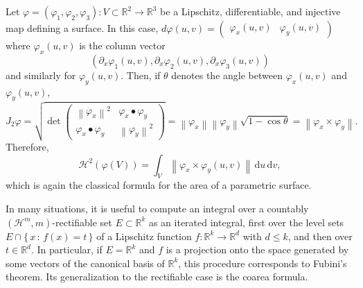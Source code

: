 \documentclass[runningheads]{llncs}
\newcommand{\norm}[1]{\left\|#1\right\|}
\def \d{\mbox{\(\,\mathrm{d}\)}}
\newcommand{\Rr}{\mathbb{R}}
\newcommand{\set}[2]{\{\,#1 \, : \, #2\,\} }
\begin{document}
\begin{example}[Surfaces]\label{ex:surfaces}
Let $\varphi = (\varphi_1, \varphi_2,\varphi_3):V\subset \Rr^2 \to \Rr^3$ be a Lipschitz, differentiable, and injective map defining a surface. In this case, $d\varphi(u,v) = \begin{pmatrix} \varphi_x(u,v) & \varphi_y(u,v)\end{pmatrix}$ where $\varphi_x(u,v)$ is the column vector $$(\partial_x\varphi_1(u,v), \partial_x\varphi_2(u,v),\partial_x\varphi_3(u,v))$$ and similarly for $\varphi_y(u,v)$. Then, if  $\theta$ denotes  the angle between $\varphi_x(u,v)$ and $\varphi_y(u,v)$,
\begin{equation}
J_2\varphi = \sqrt{\det\begin{pmatrix}
\norm{\varphi_x}^2 & \varphi_x \bullet \varphi_y \\
\varphi_x \bullet \varphi_y & \norm{\varphi_y}^2
\end{pmatrix}}= \norm{\varphi_x}\norm{\varphi_y} \sqrt{1-\cos\theta} = \norm{\varphi_x \times \varphi_y}.
\end{equation}
 Therefore,
\begin{equation}
\mathcal H^2(\varphi(V)) = \int_V \norm{\varphi_x \times \varphi_y(u,v)} \d u\d v,
\end{equation}
which is again the classical formula for the area of a parametric surface.
\end{example}

In many situations, it is useful to compute an integral over a countably $(\mathcal H^m,m)$-rectifiable set $E\subset \Rr^k$ as an iterated integral, first over the level sets $E\cap \set{x}{f(x)=t}$ of a Lipschitz function $f:\Rr^k\to \Rr^d$ with $d\leq k$, and then over $t\in \Rr^d$. In particular, if $E=\Rr^k$ and $f$ is a projection onto the space generated by some vectors of the canonical basis of $\Rr^k$, this procedure corresponds to Fubini's theorem. Its generalization to the rectifiable case is the coarea formula.
\end{document}
